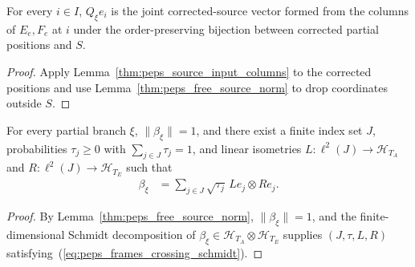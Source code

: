 \begin{lemma}
    \label{thm:peps_corrected_source_columns}
    \leanok
    For every $i\in I$, $Q_\xi e_i$ is the joint
    corrected-source vector formed from the columns of $E_e,F_e$ at $i$ under the order-preserving bijection between corrected partial positions and $S$.
\end{lemma}
\begin{proof}
    \leanok
    Apply Lemma~\ref{thm:peps_source_input_columns} to the corrected positions and use Lemma~\ref{thm:peps_free_source_norm} to drop coordinates outside $S$.
\end{proof}


\begin{lemma}
    \label{thm:peps_crossing_schmidt}
    \leanok
    For every partial branch $\xi$, $\|\beta_\xi\|=1$, and there exist a finite index set
    $J$, probabilities $\tau_j\geq0$ with $\sum_{j\in J}\tau_j=1$, and linear
    isometries $L\colon\ell^2(J)\to\mathcal H_{T_A}$ and
    $R\colon\ell^2(J)\to\mathcal H_{T_E}$ such that
    \begin{align}
        \beta_\xi & = \sum_{j\in J}\sqrt{\tau_j}\,Le_j\otimes Re_j.
        \label{eq:peps_frames_crossing_schmidt}
    \end{align}
\end{lemma}
\begin{proof}
    \leanok
    By Lemma~\ref{thm:peps_free_source_norm}, $\|\beta_\xi\|=1$, and the finite-dimensional Schmidt decomposition of $\beta_\xi\in\mathcal H_{T_A}\otimes\mathcal H_{T_E}$ supplies $(J,\tau,L,R)$ satisfying~(\ref{eq:peps_frames_crossing_schmidt}).
\end{proof}

